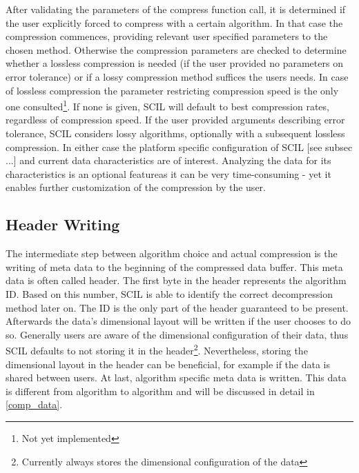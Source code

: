 \documentclass[
	12pt,
	a4paper,
	BCOR10mm,
	DIV14,
	headsepline,
]{scrreprt}
\renewcommand*{\thefootnote}{\fnsymbol{footnote}}
\begin{document}
After validating the parameters of the compress function call, it is determined
if the user explicitly forced to compress with a certain algorithm. In that case
the compression commences, providing relevant user specified parameters to the
chosen method. Otherwise the compression parameters are checked to determine
whether a lossless compression is needed (if the user provided no parameters on
error tolerance) or if a lossy compression method suffices the users needs. In
case of lossless compression the parameter restricting compression speed is
the only one consulted\footnote{Not yet implemented}. If none is given, SCIL
will default to best compression rates, regardless of compression speed. If the
user provided arguments describing error tolerance, SCIL considers lossy
algorithms, optionally with a subsequent lossless
compression\footnotemark[\value{footnote}]. In either case the platform specific
configuration of SCIL [see subsec ...] and current data characteristics are of
interest. Analyzing the data for its characteristics is an optional
feature\footnotemark[\value{footnote}] as it can be very time-consuming - yet it
enables further customization of the compression by the user.

\setcounter{footnote}{0}

\clearpage

\subsection{Header Writing}

\bigskip

\renewcommand*{\thefootnote}{\arabic{footnote}}

The intermediate step between algorithm choice and actual compression is the
writing of meta data to the beginning of the compressed data buffer. This meta
data is often called header. The first byte in the header represents the
algorithm ID. Based on this number, SCIL is able to identify the correct decompression
method later on. The ID is the only part of the header guaranteed to be present.
Afterwards the data's dimensional layout will be written if the user chooses to
do so. Generally users are aware of the dimensional configuration of their data,
thus SCIL defaults to not storing it in the header\footnote{Currently always stores the dimensional configuration of the data}.
Nevertheless, storing the
dimensional layout in the header can be beneficial, for example if the data is
shared between users. At last, algorithm specific meta data is written. This
data is different from algorithm to algorithm and will be discussed in detail
in \cref{comp_data}.
\end{document}

